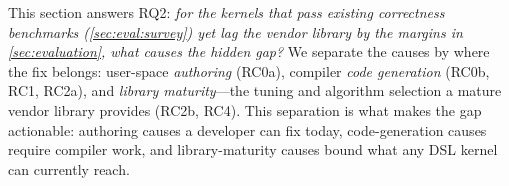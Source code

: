
This section answers RQ2: \emph{for the kernels that pass existing correctness benchmarks (\cref{sec:eval:survey}) yet lag the vendor library by the margins in \cref{sec:evaluation}, what causes the hidden gap?}
We separate the causes by where the fix belongs: user-space \emph{authoring} (RC0a), compiler \emph{code generation} (RC0b, RC1, RC2a), and \emph{library maturity}---the tuning and algorithm selection a mature vendor library provides (RC2b, RC4).
This separation is what makes the gap actionable: authoring causes a developer can fix today, code-generation causes require compiler work, and library-maturity causes bound what any DSL kernel can currently reach.

